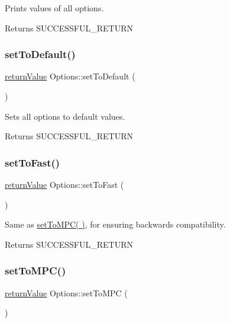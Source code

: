 Prints values of all options. \begin{DoxyReturn}{Returns}
S\+U\+C\+C\+E\+S\+S\+F\+U\+L\+\_\+\+R\+E\+T\+U\+RN 
\end{DoxyReturn}
\mbox{\label{class_options_abea747512c08e02ef1148efec0fcddca}} 
\subsubsection{\texorpdfstring{set\+To\+Default()}{setToDefault()}}
{\footnotesize\ttfamily \hyperlink{_message_handling_8hpp_a81d556f613bfbabd0b1f9488c0fa865e}{return\+Value} Options\+::set\+To\+Default (\begin{DoxyParamCaption}{ }\end{DoxyParamCaption})}

Sets all options to default values. \begin{DoxyReturn}{Returns}
S\+U\+C\+C\+E\+S\+S\+F\+U\+L\+\_\+\+R\+E\+T\+U\+RN 
\end{DoxyReturn}
\mbox{\label{class_options_a78bc5793ae28467496254f6b59f503c0}} 
\subsubsection{\texorpdfstring{set\+To\+Fast()}{setToFast()}}
{\footnotesize\ttfamily \hyperlink{_message_handling_8hpp_a81d556f613bfbabd0b1f9488c0fa865e}{return\+Value} Options\+::set\+To\+Fast (\begin{DoxyParamCaption}{ }\end{DoxyParamCaption})}

Same as \hyperlink{class_options_a3127057d81b63c2206a3a59adca44b9b}{set\+To\+M\+P\+C( )}, for ensuring backwards compatibility. \begin{DoxyReturn}{Returns}
S\+U\+C\+C\+E\+S\+S\+F\+U\+L\+\_\+\+R\+E\+T\+U\+RN 
\end{DoxyReturn}
\mbox{\label{class_options_a3127057d81b63c2206a3a59adca44b9b}} 
\subsubsection{\texorpdfstring{set\+To\+M\+P\+C()}{setToMPC()}}
{\footnotesize\ttfamily \hyperlink{_message_handling_8hpp_a81d556f613bfbabd0b1f9488c0fa865e}{return\+Value} Options\+::set\+To\+M\+PC (\begin{DoxyParamCaption}{ }\end{DoxyParamCaption})}

